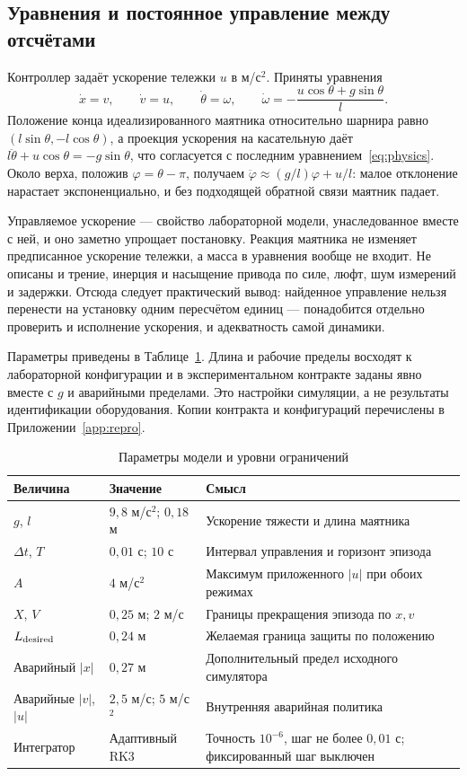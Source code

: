 \subsection{Уравнения и постоянное управление между отсчётами}
Контроллер задаёт ускорение тележки $u$ в м/с$^2$. Приняты уравнения
\begin{equation}
\dot x=v,\qquad \dot v=u,\qquad \dot\theta=\omega,\qquad
\dot\omega=-\frac{u\cos\theta+g\sin\theta}{l}.
\label{eq:physics}
\end{equation}
Положение конца идеализированного маятника относительно шарнира равно $(l\sin\theta,-l\cos\theta)$, а проекция ускорения на касательную даёт $l\ddot\theta+u\cos\theta=-g\sin\theta$, что согласуется с последним уравнением~\eqref{eq:physics}. Около верха, положив $\varphi=\theta-\pi$, получаем $\ddot\varphi\approx(g/l)\varphi+u/l$: малое отклонение нарастает экспоненциально, и без подходящей обратной связи маятник падает.

Управляемое ускорение — свойство лабораторной модели, унаследованное вместе с ней, и оно заметно упрощает постановку. Реакция маятника не изменяет предписанное ускорение тележки, а масса в уравнения вообще не входит. Не описаны и трение, инерция и насыщение привода по силе, люфт, шум измерений и задержки. Отсюда следует практический вывод: найденное управление нельзя перенести на установку одним пересчётом единиц — понадобится отдельно проверить и исполнение ускорения, и адекватность самой динамики.

Параметры приведены в Таблице~\ref{tab:physics}. Длина и рабочие пределы восходят к лабораторной конфигурации и в экспериментальном контракте заданы явно вместе с $g$ и аварийными пределами. Это настройки симуляции, а не результаты идентификации оборудования. Копии контракта и конфигураций перечислены в Приложении~\ref{app:repro}.
\begin{table}[htbp]\caption{Параметры модели и уровни ограничений}\label{tab:physics}
\begin{smalltable}\begin{tabularx}{\linewidth}{@{}l l X@{}}\toprule
Величина & Значение & Смысл\\\midrule
$g$, $l$ & $9{,}8$ м/с$^2$; $0{,}18$ м & Ускорение тяжести и длина маятника\\
$\Delta t$, $T$ & $0{,}01$ с; $10$ с & Интервал управления и горизонт эпизода\\
$A$ & $4$ м/с$^2$ & Максимум приложенного $|u|$ при обоих режимах\\
$X$, $V$ & $0{,}25$ м; $2$ м/с & Границы прекращения эпизода по $x,v$\\
$L_{\rm desired}$ & $0{,}24$ м & Желаемая граница защиты по положению\\
Аварийный $|x|$ & $0{,}27$ м & Дополнительный предел исходного симулятора\\
Аварийные $|v|$, $|u|$ & $2{,}5$ м/с; $5$ м/с$^2$ & Внутренняя аварийная политика\\
Интегратор & Адаптивный RK3 & Точность $10^{-6}$, шаг не более $0{,}01$ с; фиксированный шаг выключен\\\bottomrule
\end{tabularx}\end{smalltable}\end{table}

